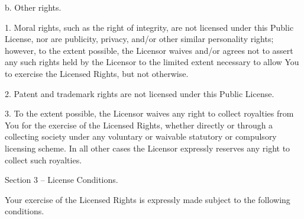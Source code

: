  b. Other rights. \begin{DoxyVerb} 1. Moral rights, such as the right of integrity, are not
    licensed under this Public License, nor are publicity,
    privacy, and/or other similar personality rights; however, to
    the extent possible, the Licensor waives and/or agrees not to
    assert any such rights held by the Licensor to the limited
    extent necessary to allow You to exercise the Licensed
    Rights, but not otherwise.

 2. Patent and trademark rights are not licensed under this
    Public License.

 3. To the extent possible, the Licensor waives any right to
    collect royalties from You for the exercise of the Licensed
    Rights, whether directly or through a collecting society
    under any voluntary or waivable statutory or compulsory
    licensing scheme. In all other cases the Licensor expressly
    reserves any right to collect such royalties.
\end{DoxyVerb}


Section 3 -- License Conditions.

Your exercise of the Licensed Rights is expressly made subject to the following conditions.

